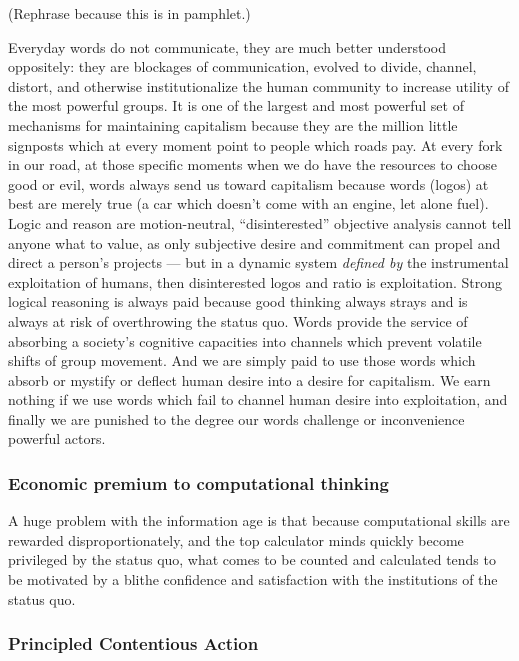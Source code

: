 \documentclass[12pt,book]{article}
\begin{document}
(Rephrase because this is in pamphlet.)

Everyday words do not communicate, they are much better understood
oppositely: they are blockages of communication, evolved to divide,
channel, distort, and otherwise institutionalize the human community to
increase utility of the most powerful groups. It is one of the largest
and most powerful set of mechanisms for maintaining capitalism because
they are the million little signposts which at every moment point to
people which roads pay. At every fork in our road, at those specific
moments when we do have the resources to choose good or evil, words
always send us toward capitalism because words (logos) at best are
merely true (a car which doesn't come with an engine, let alone fuel).
Logic and reason are motion-neutral, ``disinterested'' objective
analysis cannot tell anyone what to value, as only subjective desire and
commitment can propel and direct a person's projects --- but in a
dynamic system \emph{defined by} the instrumental exploitation of
humans, then disinterested logos and ratio is exploitation. Strong
logical reasoning is always paid because good thinking always strays and
is always at risk of overthrowing the status quo. Words provide the
service of absorbing a society's cognitive capacities into channels
which prevent volatile shifts of group movement. And we are simply paid
to use those words which absorb or mystify or deflect human desire into
a desire for capitalism. We earn nothing if we use words which fail to
channel human desire into exploitation, and finally we are punished to
the degree our words challenge or inconvenience powerful actors.

\subsubsection{Economic premium to computational
thinking}\label{economic-premium-to-computational-thinking}

A huge problem with the information age is that because computational
skills are rewarded disproportionately, and the top calculator minds
quickly become privileged by the status quo, what comes to be counted
and calculated tends to be motivated by a blithe confidence and
satisfaction with the institutions of the status quo.

\subsubsection{Principled Contentious
Action}\label{principled-contentious-action}
\end{document}
